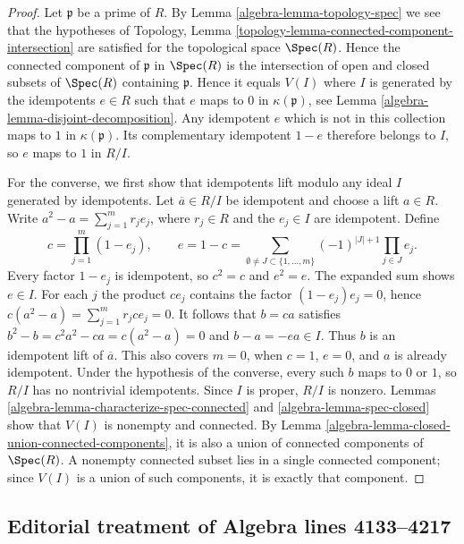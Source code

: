 \begin{proof}
Let $\mathfrak p$ be a prime of $R$. By
Lemma \ref{algebra-lemma-topology-spec}
we see that the hypotheses of
Topology, Lemma \ref{topology-lemma-connected-component-intersection}
are satisfied for the topological space $\Spec(R)$.
Hence the connected component of $\mathfrak p$ in $\Spec(R)$
is the intersection of open and closed subsets of $\Spec(R)$
containing $\mathfrak p$. Hence it equals $V(I)$ where
$I$ is generated by the idempotents $e \in R$ such that $e$ maps to $0$
in $\kappa(\mathfrak p)$, see
Lemma \ref{algebra-lemma-disjoint-decomposition}.
Any idempotent $e$ which is not in this collection maps to $1$
in $\kappa(\mathfrak p)$. Its complementary idempotent $1-e$
therefore belongs to $I$, so $e$ maps to $1$ in $R/I$.

\medskip\noindent
For the converse, we first show that idempotents lift modulo any ideal
$I$ generated by idempotents. Let $\overline a\in R/I$ be idempotent
and choose a lift $a\in R$. Write
$a^2-a=\sum_{j=1}^m r_je_j$, where $r_j\in R$ and the $e_j\in I$
are idempotent. Define
$$
c=\prod_{j=1}^m(1-e_j),\qquad
e=1-c=
\sum_{\emptyset\ne J\subset\{1,\ldots,m\}}
(-1)^{|J|+1}\prod_{j\in J}e_j.
$$
Every factor $1-e_j$ is idempotent, so $c^2=c$ and $e^2=e$.
The expanded sum shows $e\in I$. For each $j$ the product $ce_j$
contains the factor $(1-e_j)e_j=0$, hence
$c(a^2-a)=\sum_{j=1}^m r_jce_j=0$.
It follows that $b=ca$ satisfies
$b^2-b=c^2a^2-ca=c(a^2-a)=0$ and $b-a=-ea\in I$.
Thus $b$ is an idempotent lift of $\overline a$.
This also covers $m=0$, when $c=1$, $e=0$, and $a$ is already idempotent.
Under the hypothesis of the converse, every such $b$ maps to $0$ or $1$,
so $R/I$ has no nontrivial idempotents. Since $I$ is proper, $R/I$ is
nonzero. Lemmas \ref{algebra-lemma-characterize-spec-connected} and
\ref{algebra-lemma-spec-closed} show that $V(I)$ is nonempty and connected.
By Lemma \ref{algebra-lemma-closed-union-connected-components}, it is also
a union of connected components of $\Spec(R)$. A nonempty connected
subset lies in a single connected component; since $V(I)$ is a union
of such components, it is exactly that component.
\end{proof}


\subsection{Editorial treatment of Algebra lines 4133--4217}

\hypertarget{algebra-context-020}{}

